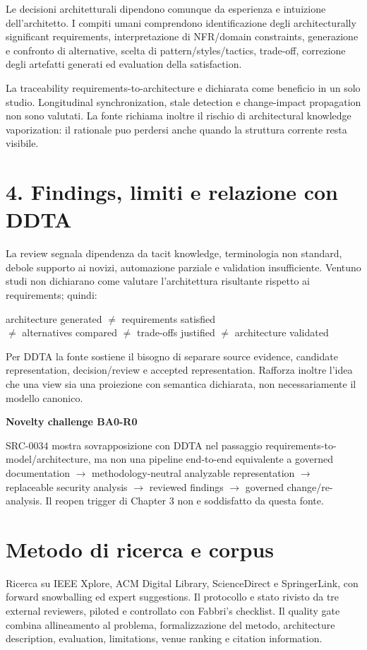 \documentclass[10.5pt,a4paper]{article}
\newenvironment{gatebox}[1]{\def\FrameCommand{\fcolorbox{ddtagreen}{ddtagray}}\MakeFramed{\advance\hsize-2\width\FrameRestore}\noindent\textbf{#1}\par\smallskip}{\endMakeFramed}
\begin{document}
Le decisioni architetturali dipendono comunque da esperienza e intuizione dell'architetto. I compiti umani comprendono identificazione degli architecturally significant requirements, interpretazione di NFR/domain constraints, generazione e confronto di alternative, scelta di pattern/styles/tactics, trade-off, correzione degli artefatti generati ed evaluation della satisfaction.

La traceability requirements-to-architecture e dichiarata come beneficio in un solo studio. Longitudinal synchronization, stale detection e change-impact propagation non sono valutati. La fonte richiama inoltre il rischio di architectural knowledge vaporization: il rationale puo perdersi anche quando la struttura corrente resta visibile.

\section{4. Findings, limiti e relazione con DDTA}
La review segnala dipendenza da tacit knowledge, terminologia non standard, debole supporto ai novizi, automazione parziale e validation insufficiente. Ventuno studi non dichiarano come valutare l'architettura risultante rispetto ai requirements; quindi:

\begin{center}\ttfamily
architecture generated $\neq$ requirements satisfied\\
$\neq$ alternatives compared $\neq$ trade-offs justified $\neq$ architecture validated
\end{center}

Per DDTA la fonte sostiene il bisogno di separare source evidence, candidate representation, decision/review e accepted representation. Rafforza inoltre l'idea che una view sia una proiezione con semantica dichiarata, non necessariamente il modello canonico.

\begin{gatebox}{Novelty challenge BA0-R0}
SRC-0034 mostra sovrapposizione con DDTA nel passaggio requirements-to-model/architecture, ma non una pipeline end-to-end equivalente a governed documentation $\rightarrow$ methodology-neutral analyzable representation $\rightarrow$ replaceable security analysis $\rightarrow$ reviewed findings $\rightarrow$ governed change/re-analysis. Il reopen trigger di Chapter 3 non e soddisfatto da questa fonte.
\end{gatebox}

\section{Metodo di ricerca e corpus}
Ricerca su IEEE Xplore, ACM Digital Library, ScienceDirect e SpringerLink, con forward snowballing ed expert suggestions. Il protocollo e stato rivisto da tre external reviewers, piloted e controllato con Fabbri's checklist. Il quality gate combina allineamento al problema, formalizzazione del metodo, architecture description, evaluation, limitations, venue ranking e citation information.
\end{document}

